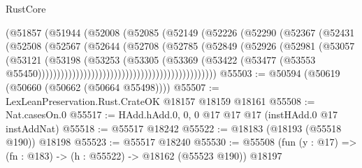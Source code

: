\begin{lexlean}{RustCore}
\begin{coremodule}
                                              (@51857
                                                (@51944
                                                  (@52008
                                                    (@52085
                                                      (@52149
                                                        (@52226
                                                          (@52290
                                                            (@52367
                                                              (@52431
                                                                (@52508
                                                                  (@52567
                                                                    (@52644
                                                                      (@52708
                                                                        (@52785
                                                                          (@52849
                                                                            (@52926
                                                                              (@52981
                                                                                (@53057
                                                                                  (@53121
                                                                                    (@53198
                                                                                      (@53253
                                                                                        (@53305
                                                                                          (@53369
                                                                                            (@53422
                                                                                              (@53477
                                                                                                (@53553
                                                                                                  @55450)))))))))))))))))))))))))))))))))))))))))))))))
@55503 := @50594 (@50619 (@50660 (@50662 (@50664 @55498))))
@55507 := LexLeanPreservation.Rust.CrateOK @18157 @18159 @18161
@55508 := Nat.casesOn.{0}
@55517 := HAdd.hAdd.{0, 0, 0} @17 @17 @17 (instHAdd.{0} @17 instAddNat)
@55518 := @55517 @18242
@55522 := @18183 (@18193 (@55518 @190)) @18198
@55523 := @55517 @18240
@55530 := @55508 (fun (y : @17) => (fn : @183) -> (h : @55522) -> @18162 (@55523 @190)) @18197

\end{coremodule}
\end{lexlean}

